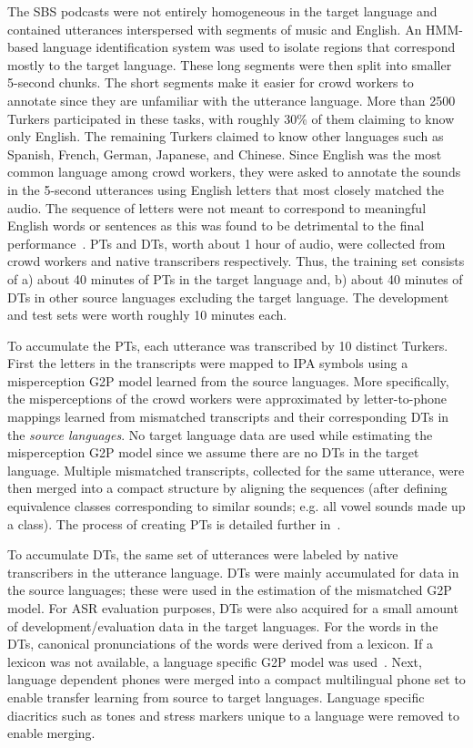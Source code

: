 \documentclass[a4paper]{article}
\begin{document}
The SBS podcasts were not entirely homogeneous in the target language and contained utterances interspersed with segments of music and English. An HMM-based language identification system was used to isolate regions that correspond mostly to the target language. These long segments were then split into smaller 5-second chunks. The short segments make it easier for crowd workers to annotate since they are unfamiliar with the utterance language. More than 2500 Turkers participated in these tasks, with roughly 30\% of them claiming to know only English. The remaining Turkers claimed to know other languages such as Spanish, French, German, Japanese, and Chinese. Since English was the most common language among crowd workers, they were asked to annotate the sounds in the 5-second utterances using English letters that most closely matched the audio. The sequence of letters were not meant to correspond to meaningful English words or sentences as this was found to be detrimental to the final performance~\cite{Jyothi2015}. PTs and DTs, worth about 1 hour of audio, were collected from crowd workers and native transcribers respectively. Thus, the training set consists of a) about 40 minutes of PTs in the target language and, b) about 40 minutes of DTs in other source languages  excluding the target language. The development and test sets were worth roughly 10 minutes each.

To accumulate the PTs, each utterance was transcribed by 10 distinct Turkers. First the letters in the transcripts were mapped to IPA symbols using a misperception G2P model learned from the source languages. More specifically, the misperceptions of the crowd workers were approximated by letter-to-phone mappings learned from mismatched transcripts and their corresponding DTs in the \emph{source languages}. No target language data are used while estimating the misperception G2P model since we assume there are no DTs in the target language. Multiple mismatched transcripts, collected for the same utterance, were then merged into a compact structure by aligning the sequences (after defining equivalence classes corresponding to similar sounds; e.g. all vowel sounds made up a class). The process of creating PTs is detailed further in~\cite{Jyothi-MismatchedCrowdsourcingTrans}.

To accumulate DTs, the same set of utterances were labeled by native transcribers in the utterance language.
DTs were mainly accumulated for data in the source languages; these  were used in the estimation of the mismatched G2P model. For ASR evaluation purposes, DTs were also acquired for a small amount of development/evaluation data in the target languages. For the words in the DTs, canonical pronunciations of the words were derived from a lexicon. If a lexicon was not available, a language specific G2P model was used~\cite{MarkG2P}. Next, language dependent phones were merged into a compact multilingual phone set to enable transfer learning from source to target languages. Language specific diacritics such as tones and stress markers unique to a language were removed to enable merging.
\end{document}
